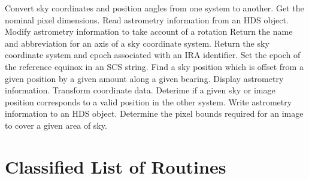    {Convert sky coordinates and position angles from one system to another.}
   {Get the nominal pixel dimensions.}
   {Read astrometry information from an HDS object.}
   {Modify astrometry information to take account of a rotation}
   {Return the name and abbreviation for an axis of a sky coordinate system.}
   {Return the sky coordinate system and epoch associated with an IRA
    identifier.}
   {Set the epoch of the reference equinox in an SCS string.}
   {Find a sky position which is offset from a given position by a given
   amount along a given  bearing.}
   {Display astrometry information.}
   {Transform coordinate data.}
   {Deterime if a given sky or image position corresponds to a valid position
    in the other system.}
   {Write astrometry information to an HDS object.}
   {Determine the pixel bounds required for an image to cover a given area of
    sky.}

\section {Classified List of Routines}

